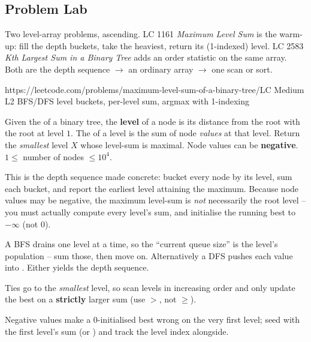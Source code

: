 \subsection{Problem Lab}

Two level-array problems, ascending. LC 1161 \emph{Maximum Level Sum} is the warm-up: fill the
depth buckets, take the heaviest, return its (1-indexed) level. LC 2583 \emph{Kth Largest Sum
in a Binary Tree} adds an order statistic on the same array. Both are the depth sequence
$\longrightarrow$ an ordinary array $\longrightarrow$ one scan or sort.

  {https://leetcode.com/problems/maximum-level-sum-of-a-binary-tree/}{LC Medium L2}
  {BFS/DFS level buckets, per-level sum, argmax with 1-indexing}

\begin{problemstatement}
Given the  of a binary tree, the \textbf{level} of a node is its distance from the
root with the root at level $1$. The  of a level is the sum of node \emph{values} at
that level. Return the \emph{smallest} level $X$ whose level-sum is maximal. Node values can
be \textbf{negative}. $1 \le$ number of nodes $\le 10^4$.
\end{problemstatement}

This is the depth sequence made concrete: bucket every node by its level, sum each bucket, and
report the earliest level attaining the maximum. Because node values may be negative, the
maximum level-sum is \emph{not} necessarily the root level -- you must actually compute every
level's sum, and initialise the running best to $-\infty$ (not $0$).

\begin{observation}
A BFS drains one level at a time, so the ``current queue size'' is the level's population --
sum those, then move on. Alternatively a DFS pushes each value into . Either
yields the depth sequence.
\end{observation}
\begin{observation}
Ties go to the \emph{smallest} level, so scan levels in increasing order and only update the
best on a \textbf{strictly} larger sum (use $>$, not $\ge$).
\end{observation}
\begin{observation}
Negative values make a $0$-initialised best wrong on the very first level; seed with the
first level's sum (or ) and track the level index alongside.
\end{observation}

